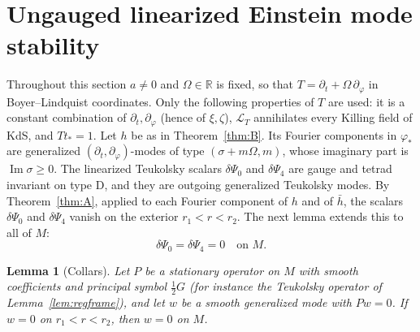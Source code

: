 \documentclass[11pt]{amsart}
\newtheorem{lemma}[theorem]{Lemma}
\theoremstyle{definition}
\theoremstyle{remark}
\numberwithin{equation}{section}
\newcommand{\cL}{\mathcal{L}}
\newcommand{\R}{\mathbb{R}}
\renewcommand{\Im}{\operatorname{Im}}
\begin{document}
\section{Ungauged linearized Einstein mode stability}\label{sec:B}

Throughout this section $a\ne0$ and $\Omega\in\R$ is fixed, so that $T=\partial_t+\Omega\,\partial_\varphi$ in
Boyer--Lindquist coordinates. Only the following properties of $T$ are used: it is a constant combination of
$\partial_t,\partial_\varphi$ (hence of $\xi,\zeta$), $\cL_T$ annihilates every Killing field of KdS, and $Tt_*=1$. Let $h$ be as in Theorem~\ref{thm:B}. Its Fourier components in $\varphi_*$ are
generalized $(\partial_t,\partial_\varphi)$-modes of type $(\sigma+m\Omega,m)$, whose imaginary part is $\Im\sigma\ge0$. The linearized
Teukolsky scalars $\delta\Psi_0$ and $\delta\Psi_4$ are gauge and tetrad invariant on type D, and they are outgoing
generalized Teukolsky modes. By Theorem~\ref{thm:A}, applied to each Fourier component of $h$ and of $\bar h$, the scalars $\delta\Psi_0$ and
$\delta\Psi_4$ vanish on the exterior $r_1<r<r_2$. The next lemma extends this to all of $M$:
\[
\delta\Psi_0=\delta\Psi_4=0\quad\text{on }M.
\]

\begin{lemma}[Collars]\label{lem:collar}
Let $P$ be a stationary operator on $M$ with smooth coefficients and principal symbol $\frac12G$ (for instance the
Teukolsky operator of Lemma~\ref{lem:regframe}), and let $w$ be a smooth generalized mode with $Pw=0$. If $w=0$ on
$r_1<r<r_2$, then $w=0$ on $M$.
\end{lemma}
\end{document}
